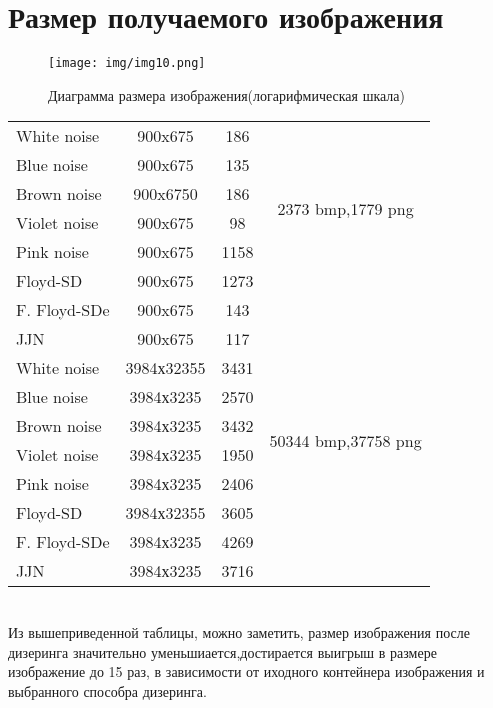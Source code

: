 \section{Размер получаемого изображения}
\begin{figure}[h!]
	\centering
	\texttt{[image: img/img10.png]}
	\caption{Диаграмма размера изображения(логарифмическая шкала)}
	\label{fig:spire06}
\end{figure}
\begin{tabular}{|@{\hspace*{2mm}}l||*{3}{c|}}\hline
	
	&\makebox[8em]{Разрешение, пикс}&\makebox[5em]{Размер, кб} &\makebox[7em]{Исх. раз., кб}
	\\\hline\hline
	White noise&900x675&186&\multirow{6}{*}{2373 bmp,1779 png} \\\cline{1-3}
	Blue noise& 900x675&135& \\\cline{1-3}
	Brown noise&900x6750&186&\\\cline{1-3}
	Violet noise &900x675&98&\\\cline{1-3}
	Pink noise &900x675&1158&\\\cline{1-3}
	Floyd-SD& 900x675&1273&\\\cline{1-3}
	F. Floyd-SDe&900x675&143&\\\cline{1-3}
	JJN &900x675&117&\\\hline
	White noise&3984х32355&3431&\multirow{6}{*}{50344 bmp,37758 png} \\\cline{1-3}
	Blue noise& 3984х3235&2570& \\\cline{1-3}
	Brown noise&3984х3235&3432&\\\cline{1-3}
	Violet noise &3984х3235&1950&\\\cline{1-3}
	Pink noise &3984х3235&2406&\\\cline{1-3}
	Floyd-SD& 3984х32355&3605&\\\cline{1-3}
	F. Floyd-SDe&3984х3235&4269&\\\cline{1-3}
	JJN &3984х3235&3716&\\\hline
\end{tabular}
\bigskip
\\
Из вышеприведенной таблицы, можно заметить, размер изображения после дизеринга значительно уменьшиается,достирается выигрыш в размере изображение до 15 раз, в зависимости от иходного контейнера изображения и выбранного способра дизеринга.
